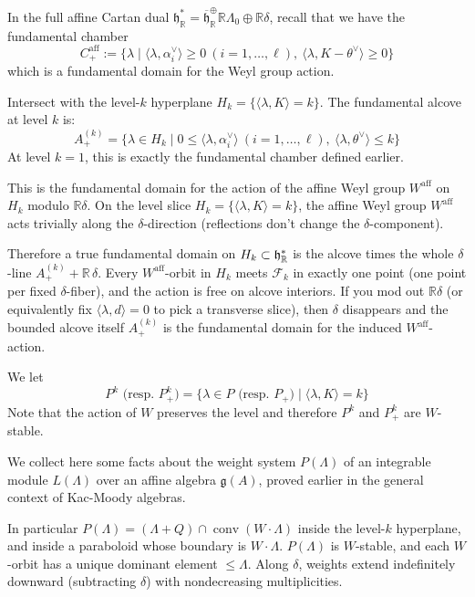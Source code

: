 \documentclass[12pt]{article}
\begin{document}
\begin{remark}
    In the full affine Cartan dual $\mathfrak{h}_\mathbb{R}^*=\overline{\mathfrak{h}}_\mathbb{R}^\oplus \mathbb{R}\Lambda_0\oplus \mathbb{R}\delta$, recall that we have the fundamental chamber 
    \[C_+^{\text{aff}} := \{\lambda \mid \langle \lambda,\alpha_i^\vee\rangle\ge 0\ (i=1,\dots,\ell),\ \langle \lambda,K-\theta^\vee\rangle\ge 0\}\] which is a fundamental domain for the Weyl group action.

    Intersect with the level-$k$ hyperplane $H_k=\{\langle \lambda,K\rangle=k\}$. The fundamental alcove at level $k$ is:
    \[A_+^{(k)} = \{\lambda\in H_k \mid 0\le \langle \lambda,\alpha_i^\vee\rangle\ (i=1,\dots,\ell),\ \langle \lambda,\theta^\vee\rangle\le k\}\]
At level $k=1$, this is exactly the fundamental chamber defined earlier. 

This is the fundamental domain for the action of the affine Weyl group $W^{\text{aff}}$ on $H_k$ modulo $\mathbb{R}\delta$. On the level slice $H_k=\{\langle\lambda,K\rangle=k\}$, the affine Weyl group $W^{\text{aff}}$ acts trivially along the $\delta$-direction (reflections don't change the $\delta$-component).

Therefore a true fundamental domain on $H_k \subset \mathfrak{h}^*_{\mathbb{R}}$ is the alcove times the whole $\delta$-line $A_+^{(k)} + \mathbb{R}\,\delta$. Every $W^{\text{aff}}$-orbit in $H_k$ meets $\mathcal{F}_k$ in exactly one point (one point per fixed $\delta$-fiber), and the action is free on alcove interiors. If you mod out $\mathbb{R}\delta$ (or equivalently fix $\langle\lambda,d\rangle=0$ to pick a transverse slice), then $\delta$ disappears and the bounded alcove itself $A_+^{(k)}$ is the fundamental domain for the induced $W^{\text{aff}}$-action.
\end{remark}

We let
\[P^k \text{ (resp. } P^k_+) = \{ \lambda \in P \text{ (resp. } P_+) \mid \langle \lambda, K \rangle = k \}\] Note that the action of $W$ preserves the level and therefore $P^k$ and $P_+^k$ are $W$-stable.


We collect here some facts about the weight system $P(\Lambda)$ of an integrable module $L(\Lambda)$ over an affine algebra $\mathfrak{g}(A)$, proved earlier in the general context of Kac-Moody algebras.

In particular $P(\Lambda)=(\Lambda+Q)\cap\operatorname{conv}(W\cdot\Lambda)$ inside the level-$k$ hyperplane, and inside a paraboloid whose boundary is $W\cdot\Lambda$. $P(\Lambda)$ is $W$-stable, and each $W$-orbit has a unique dominant element $\leq \Lambda$. Along $\delta$, weights extend indefinitely downward (subtracting $\delta$) with nondecreasing multiplicities.
\end{document}
